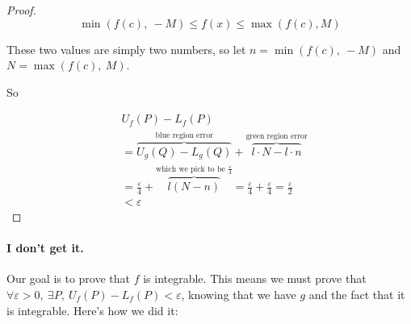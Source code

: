 \documentclass[12pt]{article}
\theoremstyle{plain}
\theoremstyle{remark}
\theoremstyle{definition}
\begin{document}
\begin{proof}
\[\min\left( f(c),\  - M \right) \leq f(x) \leq \max\left( f(c),M \right)\]

These two values are simply two numbers, so let
\(n = \min\left( f(c),\  - M \right)\) and
\(N = \max\left( f(c),\ M \right)\).

So

\begin{align*}
&U_{f}(P) - L_{f}(P)  \\
&= \overset{\text{blue\ region\ error}}{\overbrace{U_{g}(Q) - L_{g}(Q)}} + \overset{\text{green\ region\ error}}{\overbrace{l \cdot N - l \cdot n}}  \\
&= \frac{\varepsilon}{4} + \overset{\text{which\ we\ pick\ to\ be\ }\frac{\varepsilon}{4}}{\overbrace{l(N - n)}} = \frac{\varepsilon}{4} + \frac{\varepsilon}{4} = \frac{\varepsilon}{2}  \\
&< \varepsilon\
\end{align*}

\end{proof}


\paragraph{I don't get it.}

Our goal is to prove that \(f\) is integrable. This means we must prove
that
\(\forall\varepsilon > 0,\ \exists P,\ U_{f}(P) - L_{f}(P) < \varepsilon\),
knowing that we have \(g\) and the fact that it is integrable. Here's
how we did it:
\end{document}
